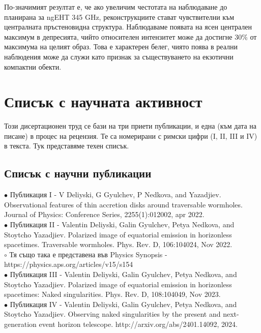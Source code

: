 \documentclass[12pt]{article}
\numberwithin{equation}{section}
\numberwithin{figure}{section}
\begin{document}
	По-значимият резултат е, че ако увеличим честотата на наблюдаване до планирана за ngEHT 345 GHz, реконструкциите стават чувствителни към централната пръстеновидна структура. Наблюдаваме появата на ясен централен максимум в депресията, чийто относителен интензитет може да достигне 30\% от максимума на целият образ. Това е характерен белег, чиято поява в реални наблюдения може да служи като признак за съществуването на екзотични компактни обекти.
	
	\newpage
	
	\section{Списък с научната активност}
	
	Този дисертационен труд се бази на три приети публикации, и една (към дата на писане) в процес на рецензия. Те са номерирани с римски цифри (I, II, III и IV) в текста. Тук представяме техен списък.
	
	\subsection{Списък с научни публикации}
	
	$\bullet$ Публикация I - V Deliyski, G Gyulchev, P Nedkova, and Yazadjiev. Observational features of thin accretion disks around traversable wormholes. Journal of Physics: Conference Series, 2255(1):012002, apr 2022.\\
	
	\noindent$\bullet$ Публикация II - Valentin Deliyski, Galin Gyulchev, Petya Nedkova, and Stoytcho Yazadjiev. Polarized image of equatorial emission in horizonless spacetimes. Traversable wormholes. Phys. Rev. D, 106:104024, Nov 2022.\\
	
	\indent$\circ$ Тя също така е представена във Physics Synopsis - \\\indent https://physics.aps.org/articles/v15/s154\\
	
	\noindent$\bullet$ Публикация III - Valentin Deliyski, Galin Gyulchev, Petya Nedkova, and Stoytcho Yazadjiev. Polarized image of equatorial emission in horizonless spacetimes: Naked singularities. Phys. Rev. D, 108:104049, Nov 2023.\\
	
	\noindent$\bullet$ Публикация IV - Valentin Deliyski, Galin Gyulchev, Petya Nedkova, and Stoytcho Yazadjiev. Observing naked singularities by the present and next-generation event horizon telescope. http://arxiv.org/abs/2401.14092, 2024.
	
\end{document}
